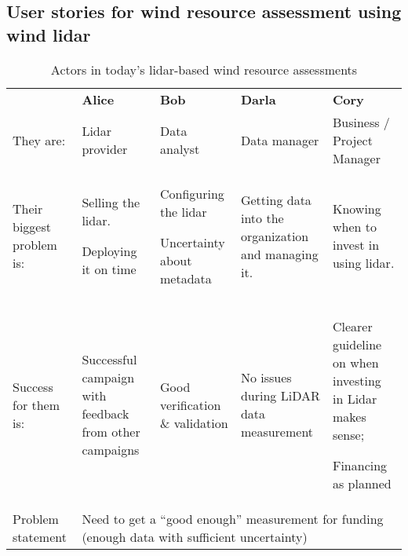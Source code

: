 \subsection*{User stories for wind resource assessment using wind lidar}

\begin{table}[!h]
 \centering
 \caption{Actors in today's lidar-based wind resource assessments}
 \begin{tabular}{@{}|p{}|p{}|p{}|p{}|p{}|@{}}
 \rowcolor{Task32Blue2} & \textbf{Alice} & \textbf{Bob} & \textbf{Darla} & \textbf{Cory} \\
They are: & 
    Lidar provider & 
    Data analyst & 
    Data manager & 
    Business / Project Manager \\
Their biggest problem is: & 
    Selling the lidar. 

    Deploying it on time &
    Configuring the lidar

    Uncertainty about metadata &
    Getting data into the organization and managing it. & 
    Knowing when to invest in using lidar. \\
Success for them is: & 
    Successful campaign with feedback from other campaigns &
    Good verification \& validation & 
    No issues during LiDAR data measurement &
    Clearer guideline on when investing in Lidar makes sense;

    Financing as planned \\
Problem statement & 
    \multicolumn{4}{p{0.74\textwidth+6\tabcolsep+3\arrayrulewidth}}{Need to get a ``good enough'' measurement for funding (enough data with sufficient uncertainty)} \\
\end{tabular}
\label{tab:01_wra_now}
\end{table}

